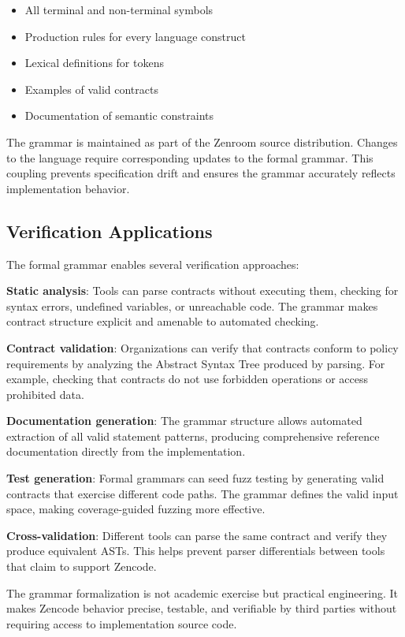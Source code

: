 \begin{itemize}
\item All terminal and non-terminal symbols
\item Production rules for every language construct
\item Lexical definitions for tokens
\item Examples of valid contracts
\item Documentation of semantic constraints
\end{itemize}

The grammar is maintained as part of the Zenroom source
distribution. Changes to the language require corresponding updates to
the formal grammar. This coupling prevents specification drift and
ensures the grammar accurately reflects implementation behavior.

\subsection{Verification Applications}

The formal grammar enables several verification approaches:

\textbf{Static analysis}: Tools can parse contracts without executing
them, checking for syntax errors, undefined variables, or unreachable
code. The grammar makes contract structure explicit and amenable to
automated checking.

\textbf{Contract validation}: Organizations can verify that contracts
conform to policy requirements by analyzing the Abstract Syntax Tree
produced by parsing. For example, checking that contracts do not use
forbidden operations or access prohibited data.

\textbf{Documentation generation}: The grammar structure allows
automated extraction of all valid statement patterns, producing
comprehensive reference documentation directly from the
implementation.

\textbf{Test generation}: Formal grammars can seed fuzz testing by
generating valid contracts that exercise different code paths. The
grammar defines the valid input space, making coverage-guided fuzzing
more effective.

\textbf{Cross-validation}: Different tools can parse the same contract
and verify they produce equivalent ASTs. This helps prevent parser
differentials between tools that claim to support Zencode.

The grammar formalization is not academic exercise but practical
engineering. It makes Zencode behavior precise, testable, and
verifiable by third parties without requiring access to implementation
source code.


